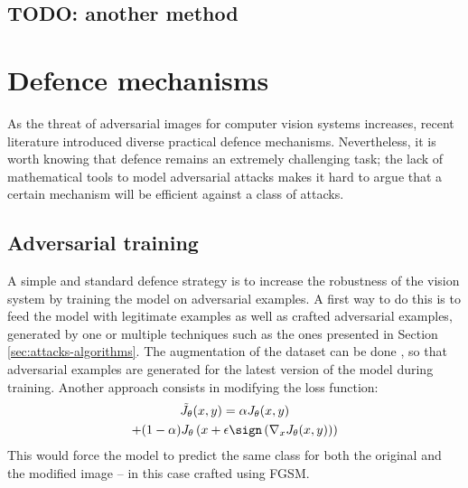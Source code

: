 \documentclass[twocolumn]{../cs-classes/cs-classes}
\begin{document}
\subsection{TODO: another method}
\lipsum[1]

\section{Defence mechanisms}
As the threat of adversarial images for computer vision systems increases, recent literature introduced diverse practical defence mechanisms. Nevertheless, it is worth knowing that defence remains an extremely challenging task; the lack of mathematical tools to model adversarial attacks makes it hard to argue that a certain mechanism will be efficient against a class of attacks.

\subsection{Adversarial training}
A simple and standard defence strategy is to increase the robustness of the vision system by training the model on adversarial examples. A first way to do this is to feed the model with legitimate examples as well as crafted adversarial examples, generated by one or multiple techniques such as the ones presented in Section \ref{sec:attacks-algorithms}. The augmentation of the dataset can be done , so that adversarial examples are generated for the latest version of the model during training. Another approach \cite{goodfellow2014explaining} consists in modifying the loss function:
\begin{multline*}
    \tilde{J}_\theta(x, y) = \alpha J_\theta(x, y) \\+ (1-\alpha)J_\theta\left(x+\epsilon\sign\left(\nabla_x J_\theta(x, y)\right)\right)
\end{multline*}
This would force the model to predict the same class for both the original and the modified image -- in this case crafted using FGSM.
\end{document}
